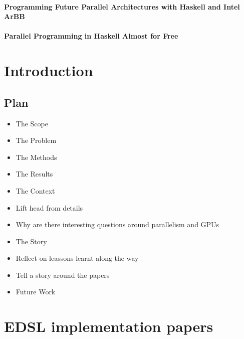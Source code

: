 \documentclass[a4paper]{book}
\newcommand{\paperARBB}{Programming Future Parallel Architectures with Haskell and Intel ArBB}
\newcommand{\paperEMBARBB}{Parallel Programming in Haskell Almost for Free}
\begin{document}
\subsubsection{\paperARBB}

\subsubsection{\paperEMBARBB}



\chapter{Introduction}

\section{Plan} 
\begin{itemize} 
  \item The Scope
  \item The Problem 
  \item The Methods
  \item The Results 
\end{itemize}

\begin{itemize} 
  \item The Context
  \item Lift head from details 
  \item Why are there interesting questions around parallelism and GPUs
  \item The Story
  \item Reflect on leassons learnt along the way 
  \item Tell a story around the papers 
  \item Future Work
\end{itemize} 




\clearpage{}


%
%

\chapter{EDSL implementation papers}
\label{chap:EDSLImplementation}
% 
\cleardoublepage 
\end{document}
